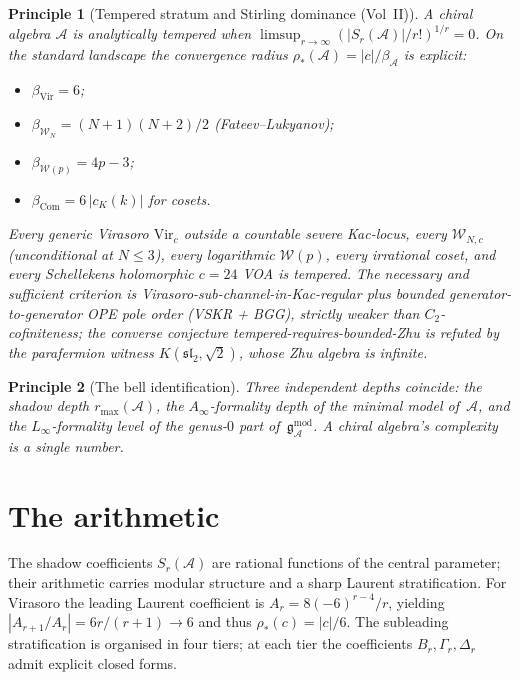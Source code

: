 \documentclass[11pt]{article}
\providecommand{\cA}{\mathcal{A}}
\providecommand{\cW}{\mathcal{W}}
\providecommand{\gAmod}{\mathfrak{g}_{\cA}^{\mathrm{mod}}}
\newtheorem*{principle}{Principle}
\begin{document}
\begin{principle}[Tempered stratum and Stirling dominance (Vol~II)]
A chiral algebra $\cA$ is \emph{analytically tempered} when
$\limsup_{r\to\infty}(|S_r(\cA)|/r!)^{1/r} = 0$. On the standard
landscape the convergence radius $\rho_*(\cA) = |c|/\beta_\cA$ is
explicit:
\begin{itemize}[nosep]
\item $\beta_{\mathrm{Vir}} = 6$;
\item $\beta_{\cW_N} = (N+1)(N+2)/2$ \textup{(Fateev--Lukyanov)};
\item $\beta_{\cW(p)} = 4p-3$;
\item $\beta_{\mathrm{Com}} = 6\,|c_K(k)|$ for cosets.
\end{itemize}
Every generic Virasoro $\mathrm{Vir}_c$ outside a countable severe
Kac-locus, every $\cW_{N,c}$ (unconditional at $N\le 3$), every
logarithmic $\cW(p)$, every irrational coset, and every Schellekens
holomorphic $c=24$ VOA is tempered. The necessary and sufficient
criterion is Virasoro-sub-channel-in-Kac-regular plus bounded
generator-to-generator OPE pole order \textup{(VSKR + BGG)}, strictly
weaker than $C_2$-cofiniteness; the converse conjecture
tempered-requires-bounded-Zhu is refuted by the parafermion witness
$K(\mathfrak{sl}_2,\sqrt{2})$, whose Zhu algebra is infinite.
\end{principle}

\begin{principle}[The bell identification]
Three independent depths coincide: the shadow depth $r_{\max}(\cA)$,
the $A_\infty$-formality depth of the minimal model of~$\cA$, and
the $L_\infty$-formality level of the genus-$0$ part of~$\gAmod$. A
chiral algebra's complexity is a single number.
\end{principle}

\section{The arithmetic}

\noindent
The shadow coefficients $S_r(\cA)$ are rational functions of the
central parameter; their arithmetic carries modular structure and a
sharp Laurent stratification. For Virasoro the leading Laurent
coefficient is $A_r = 8(-6)^{r-4}/r$, yielding
$|A_{r+1}/A_r| = 6r/(r+1)\to 6$ and thus $\rho_*(c) = |c|/6$. The
subleading stratification is organised in four tiers; at each tier
the coefficients $B_r, \Gamma_r, \Delta_r$ admit explicit closed
forms.
\end{document}
